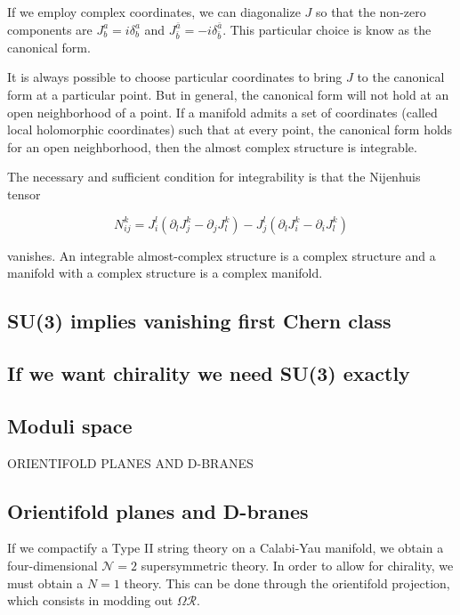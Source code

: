 If we employ complex coordinates, we can diagonalize $J$ so that the non-zero components are
$J^a_b=i\delta^a_b$ and $J^{\bar a}_{\bar b}=-i\delta^{\bar a}_{\bar b}$. This particular choice
is know as the canonical form.



It is always possible to choose particular coordinates to bring $J$ to the canonical form at a particular 
point.
But in general, the canonical form will not hold at an open neighborhood of a point.
If a manifold admits a set of coordinates (called local holomorphic coordinates) such that at every
point, the canonical form holds for an open neighborhood, then the almost complex structure is integrable.

The necessary and sufficient condition for integrability is that the Nijenhuis tensor

\begin{equation}
  N^k_{ij}= J^l_i(\partial_l J^k_j - \partial_j J^k_l) - J_j^l (\partial_l J^k_i - \partial_i J^k_l)
\end{equation}

vanishes.
An integrable almost-complex structure is a complex structure and a manifold with a complex structure
is a complex manifold.


\subsection{SU(3) implies vanishing first Chern class}

\subsection{If we want chirality we need SU(3) exactly}


\subsection{Moduli space}


ORIENTIFOLD PLANES AND D-BRANES

\subsection{Orientifold planes and D-branes}

If we compactify a Type II string theory on a Calabi-Yau manifold, we  obtain a four-dimensional
$\mathcal N=2$ supersymmetric theory.
In order to allow for chirality, we must obtain a $N=1$ theory. This can be done through the orientifold
projection, which consists in modding out $\Omega \mathcal R$.


